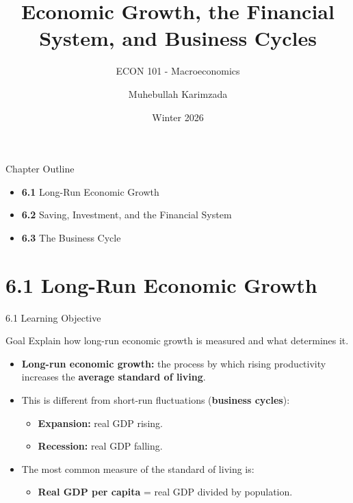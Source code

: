 \documentclass[aspectratio=169]{beamer}
\title{\textbf{Economic Growth, the Financial System, and Business Cycles  \vspace{.5cm}\\  }}
\subtitle{ {\large ECON 101 - Macroeconomics}}
\author{Muhebullah Karimzada}
\date{Winter 2026}
\begin{document}
\begin{frame}[plain]
  \titlepage
\end{frame}

\begin{frame}{Chapter Outline}
\transfade
\begin{itemize}
  \item \textbf{6.1} Long-Run Economic Growth
  \item \textbf{6.2} Saving, Investment, and the Financial System
  \item \textbf{6.3} The Business Cycle
\end{itemize}
\end{frame}

\section{6.1 Long-Run Economic Growth}

\begin{frame}{6.1 Learning Objective}
\transfade
\begin{block}{Goal}
Explain how long-run economic growth is measured and what determines it.
\end{block}
\begin{itemize}
  \item \textbf{Long-run economic growth:} the process by which rising \alert{productivity} increases the \textbf{average standard of living}.
  \item This is different from short-run fluctuations (\textbf{business cycles}):
  \begin{itemize}
    \item \textbf{Expansion:} real GDP rising.
    \item \textbf{Recession:} real GDP falling.
  \end{itemize}
  \item The most common measure of the standard of living is:
  \begin{itemize}
    \item \textbf{Real GDP per capita} = real GDP divided by population.
  \end{itemize}
\end{itemize}
\end{frame}
\end{document}
